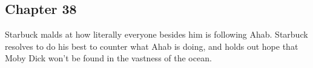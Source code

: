 \subsection{Chapter 38}

Starbuck malds at how literally everyone besides him is following Ahab.
Starbuck resolves to do his best to counter what Ahab is doing, and holds out
hope that Moby Dick won't be found in the vastness of the ocean.
